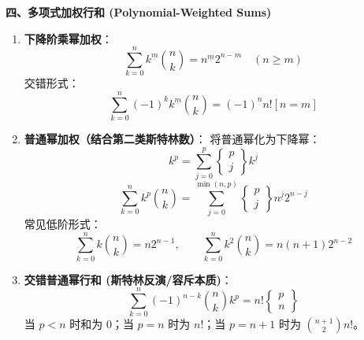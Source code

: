 \textbf{四、多项式加权行和 (Polynomial-Weighted Sums)}
\begin{enumerate}
    \item \textbf{下降阶乘幂加权}：
    \[
    \sum_{k=0}^n k^{\underline{m}} \binom{n}{k} = n^{\underline{m}} 2^{n-m} \quad (n \ge m)
    \]
    交错形式：
    \[
    \sum_{k=0}^n (-1)^k k^{\underline{m}} \binom{n}{k} = (-1)^n n! [n = m]
    \]
    \item \textbf{普通幂加权（结合第二类斯特林数）}：
    将普通幂化为下降幂：
    \[
    k^p = \sum_{j=0}^p \left\{ \begin{matrix} p \\ j \end{matrix} \right\} k^{\underline{j}}
    \]
    \[
    \sum_{k=0}^n k^p \binom{n}{k} = \sum_{j=0}^{\min(n, p)} \left\{ \begin{matrix} p \\ j \end{matrix} \right\} n^{\underline{j}} 2^{n-j}
    \]
    常见低阶形式：
    \[
    \sum_{k=0}^n k \binom{n}{k} = n 2^{n-1}, \qquad \sum_{k=0}^n k^2 \binom{n}{k} = n(n+1) 2^{n-2}
    \]
    \item \textbf{交错普通幂行和 (斯特林反演/容斥本质)}：
    \[
    \sum_{k=0}^n (-1)^{n-k} \binom{n}{k} k^p = n! \left\{ \begin{matrix} p \\ n \end{matrix} \right\}
    \]
    当 $p < n$ 时和为 $0$；当 $p = n$ 时为 $n!$；当 $p = n+1$ 时为 $\binom{n+1}{2} n!$。
\end{enumerate}

